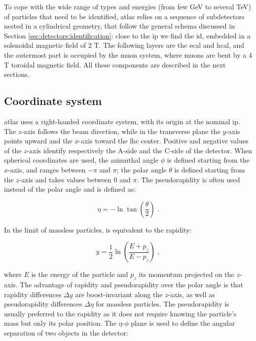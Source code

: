 To cope with the wide range of types and energies (from few GeV to several TeV) of particles that need to be identified, \gls{atlas} relies on a sequence of subdetectors nested in a cylindrical geometry, that follow the general schema discussed in Section \ref{sec:detectors:identification}: close to the \gls{ip} we find the \gls{id}, embedded in a solenoidal magnetic field of 2 T. The following layers are the \gls{ecal} and \gls{hcal}, and the outermost part is occupied by the muon system, where muons are bent by a 4 T toroidal magnetic field. All these components are described in the next sections.

\subsection{Coordinate system}

\gls{atlas} uses a right-handed coordinate system, with its origin at the nominal \gls{ip}. The $z$-axis follows the beam direction, 
while in the transverse plane the $y$-axis points upward and the $x$-axis toward the \gls{lhc} center. Positive and negative values of the $z$-axis identify respectively the A-side and the C-side of the detector. 
When spherical coordinates are used, the azimuthal angle $\phi$ is defined starting from the $x$-axis, 
and ranges between $-\pi$ and $\pi$; the polar angle $\theta$ is defined starting from the $z$-axis and takes values between $0$ and $\pi$. 
The pseudorapidity is often used instead of the polar angle and is defined as: 
 
\begin{equation}
\eta = - \ln\tan\left(\frac{\theta}{2}\right) \; . \nonumber
\label{eq:cern:eta}
\end{equation}

\noindent In the limit of massless particles, is equivalent to the rapidity:

\begin{equation}
y = \frac{1}{2} \ln\left(\frac{E + p_z}{E - p_z}\right) \; , \nonumber
\label{eq:cern:y}
\end{equation}

\noindent where $E$ is the energy of the particle and $p_z$ its momentum projected on the $z$-axis. 
The advantage of rapidity and pseudorapidity over the polar angle is that rapidity differences $\Delta y$ are boost-invariant 
along the $z$-axis, as well as pseudorapidity differences $\Delta \eta$ for massless particles.
The pseudorapidity is usually preferred to the rapidity as it does not require
knowing the particle’s mass but only its polar position.
The $\eta$-$\phi$ plane is used to define the angular separation of two objects in the detector:

